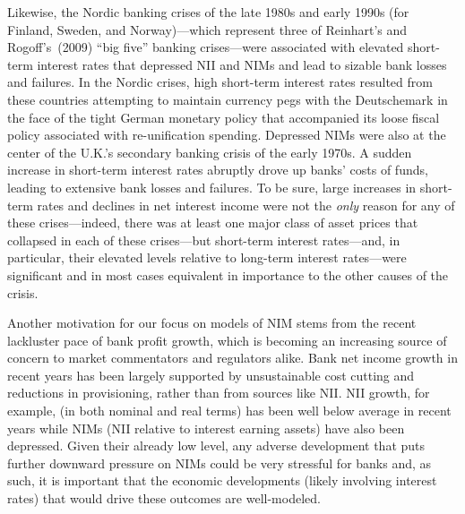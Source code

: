 \documentclass[11pt]{article}
\renewcommand{\baselinestretch}{1.5}
\begin{document}
Likewise, the Nordic banking crises of the late 1980s and early 1990s (for Finland, Sweden, and Norway)---which represent three of Reinhart's and Rogoff's~(2009) ``big five'' banking crises---were associated with elevated short-term interest rates that depressed NII and NIMs and lead to sizable bank losses and failures. In the Nordic crises, high short-term interest rates resulted from these countries attempting to maintain currency pegs with the Deutschemark in the face of the tight German monetary policy that accompanied its loose fiscal policy associated with re-unification spending. Depressed NIMs were also at the center of the U.K.'s secondary banking crisis of the early 1970s. A sudden increase in short-term interest rates abruptly drove up banks' costs of funds,  leading to extensive bank losses and failures.  To be sure, large increases in short-term rates and declines in net interest income were not the \textit{only} reason for any of these crises---indeed, there was at least one major class of asset prices that collapsed in each of these crises---but short-term interest rates---and, in particular, their elevated levels relative to long-term interest rates---were significant and in most cases equivalent in importance to the other causes of the crisis.

Another motivation for our focus on models of NIM stems from the recent lackluster pace of bank profit growth, which is becoming an increasing source of concern to market commentators and regulators alike. Bank net income growth in recent years has been largely supported by unsustainable cost cutting and reductions in provisioning, rather than from sources like NII.  NII growth, for example, (in both nominal and real terms) has been well below average in recent years while NIMs (NII relative to interest earning assets) have also been depressed.%
Given their already low level, any adverse development that puts further downward pressure on NIMs could be very stressful for banks and, as such, it is important that the economic developments (likely involving interest rates) that would drive these outcomes are well-modeled.
\end{document}
